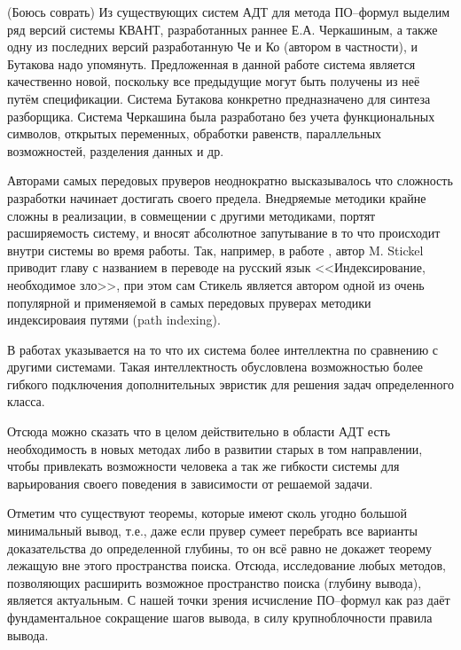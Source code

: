 
(Боюсь соврать)
Из существующих систем АДТ для метода ПО--формул выделим ряд версий системы КВАНТ, разработанных раннее Е.А. Черкашиным, а также одну из последних версий разработанную Че и Ко (автором в частности), и Бутакова надо упомянуть. Предложенная в данной работе система является качественно новой, поскольку все предыдущие могут быть получены из неё путём спецификации. Система Бутакова конкретно предназначено для синтеза разборщика. Система Черкашина была разработано без учета функциональных символов, открытых переменных, обработки равенств, параллельных возможностей, разделения данных и др. %

Авторами самых передовых пруверов неоднократно высказывалось что сложность разработки начинает достигать своего предела. Внедряемые методики крайне сложны в реализации, в совмещении с другими методиками, портят расширяемость систему, и вносят абсолютное запутывание в то что происходит внутри системы во время работы. Так, например, в работе \cite{BTPstickel}, автор M. Stickel приводит главу с названием в переводе на русский язык <<Индексирование, необходимое зло>>, при этом сам Стикель является автором одной из очень популярной и применяемой в самых передовых пруверах методики индексироваия путями (path indexing).

В работах \cite{Eprover} указывается на то что их система более интеллектна по сравнению с другими системами. Такая интеллектность обусловлена возможностью более гибкого подключения дополнительных эвристик для решения задач определенного класса.

Отсюда можно сказать что в целом действительно в области АДТ есть необходимость в новых методах либо в развитии старых в том направлении, чтобы привлекать возможности человека а так же гибкости системы для варьирования своего поведения в зависимости от решаемой задачи.

Отметим что существуют теоремы, которые имеют сколь угодно большой минимальный вывод, т.е., даже если прувер сумеет перебрать все варианты доказательства до определенной глубины, то он всё равно не докажет теорему лежащую вне этого пространства поиска. Отсюда, исследование любых методов, позволяющих расширить возможное пространство поиска (глубину вывода), является актуальным. С нашей точки зрения исчисление ПО--формул как раз даёт фундаментальное сокращение шагов вывода, в силу крупноблочности правила вывода.

